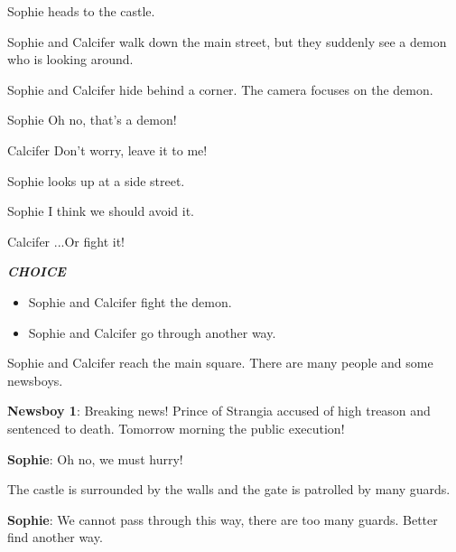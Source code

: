 \vspace{1em}

Sophie heads to the castle.


Sophie and Calcifer walk down the main street, but they suddenly see a demon who is looking around.

\begin{screenplay}

Sophie and Calcifer hide behind a corner. The camera focuses on the demon.

\begin{dialogue}[worried]{Sophie}
Oh no, that’s a demon!
\end{dialogue}
\begin{dialogue}[feisty]{Calcifer}
Don’t worry, leave it to me!
\end{dialogue}

Sophie looks up at a side street.

\begin{dialogue}{Sophie}
I think we should avoid it.
\end{dialogue}

\begin{dialogue}{Calcifer}
...Or fight it!
\end{dialogue}
\end{screenplay}
\vspace{1em}

\textit{\textbf{CHOICE}}
\begin{itemize}
  \item Sophie and Calcifer fight the demon.
  \item Sophie and Calcifer go through another way.
\end{itemize}
  
Sophie and Calcifer reach the main square. There are many people and some newsboys.

\textbf{Newsboy 1}: Breaking news! Prince of Strangia accused of high treason and sentenced to death. Tomorrow morning the public execution!

\textbf{Sophie}: Oh no, we must hurry!

The castle is surrounded by the walls and the gate is patrolled by many guards.


\textbf{Sophie}: We cannot pass through this way, there are too many guards. Better find another way.

